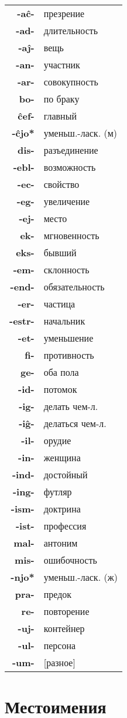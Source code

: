 \documentclass{article}
\begin{document}
\begin{tabular}{>{\bfseries}rl}
-aĉ- & презрение \\
-ad- & длительность \\
-aĵ- & вещь \\
-an- & участник \\
-ar- & совокупность \\
bo- & по браку \\
ĉef- & главный \\
-ĉjo* & уменьш.-ласк. (м) \\
dis- & разъединение \\
-ebl- & возможность \\
-ec- & свойство \\
-eg- & увеличение \\
-ej- & место \\
ek- & мгновенность \\
eks- & бывший \\
-em- & склонность \\
-end- & обязательность \\
-er- & частица \\
-estr- & начальник \\
-et- & уменьшение \\
fi- & противность \\
ge- & оба пола \\
-id- & потомок \\
-ig- & делать чем-л. \\
-iĝ- & делаться чем-л. \\
-il- & орудие \\
-in- & женщина \\
-ind- & достойный \\
-ing- & футляр \\
-ism- & доктрина \\
-ist- & профессия \\
mal- & антоним \\
mis- & ошибочность \\
-njo* & уменьш.-ласк. (ж) \\
pra- & предок \\
re- & повторение \\
-uj- & контейнер \\
-ul- & персона \\
-um- & [разное] \\
\end{tabular}

\section{Местоимения}
\end{document}
